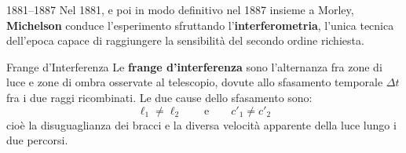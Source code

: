 \begin{notastorica}{1881--1887}
Nel 1881, e poi in modo definitivo nel 1887 insieme a Morley, \textbf{Michelson} conduce l'esperimento sfruttando l'\textbf{interferometria}, l'unica tecnica dell'epoca capace di raggiungere la sensibilità del secondo ordine richiesta.
\end{notastorica}

\begin{definizione}{Frange d'Interferenza}
Le \textbf{frange d'interferenza} sono l'alternanza fra zone di luce e zone di ombra osservate al telescopio, dovute allo sfasamento temporale $\Delta t$ fra i due raggi ricombinati. Le due cause dello sfasamento sono:
\begin{equation*}
    \ell_1 \neq \ell_2
    \qquad \text{e} \qquad
    c'_1 \neq c'_2
\end{equation*}
cioè la disuguaglianza dei bracci e la diversa velocità apparente della luce lungo i due percorsi.
\end{definizione}

